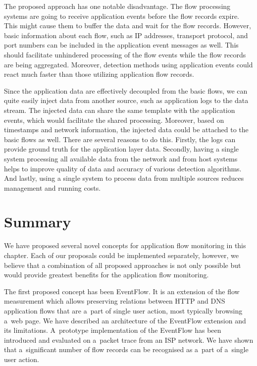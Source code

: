 The proposed approach has one notable disadvantage. The flow processing systems are going to receive application events before the flow records expire. This might cause them to buffer the data and wait for the flow records. However, basic information about each flow, such as IP addresses, transport protocol, and port numbers can be included in the application event messages as well. This should facilitate unhindered processing of the flow events while the flow records are being aggregated. Moreover, detection methods using application events could react much faster than those utilizing application flow records.

Since the application data are effectively decoupled from the basic flows, we can quite easily inject data from another source, such as application logs to the data stream. The injected data can share the same template with the application events, which would facilitate the shared processing. Moreover, based on timestamps and network information, the injected data could be attached to the basic flows as well. There are several reasons to do this. Firstly, the logs can provide ground truth for the application layer data. Secondly, having a single system processing all available data from the network and from host systems helps to improve quality of data and accuracy of various detection algorithms. And lastly, using a single system to process data from multiple sources reduces management and running costs.

\section{Summary}\label{sec:ng-summary}

We have proposed several novel concepts for application flow monitoring in this chapter. Each of our proposals could be implemented separately, however, we believe that a combination of all proposed approaches is not only possible but would provide greatest benefits for the application flow monitoring.

The first proposed concept has been EventFlow. It is an extension of the flow measurement which allows preserving relations between HTTP and DNS application flows that are a~part of single user action, most typically browsing a~web page. We have described an architecture of the EventFlow extension and its limitations. A~prototype implementation of the EventFlow has been introduced and evaluated on a~packet trace from an ISP network. We have shown that a~significant number of flow records can be recognised as a~part of a~single user action.

